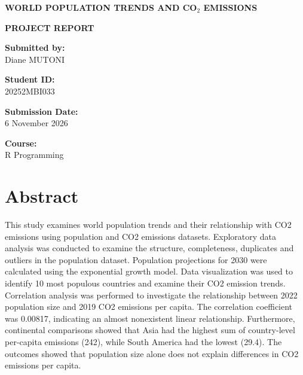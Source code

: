 \documentclass[10pt,a4paper]{article}
\begin{document}
\begin{titlepage}

\begin{center}

\vspace*{2cm}

{\Large\textbf{WORLD POPULATION TRENDS AND CO$_2$ EMISSIONS}}

\vspace{1.5cm}

{\large\textbf{PROJECT REPORT}}

\vspace{1.5cm}

\textbf{Submitted by:}\\
Diane MUTONI

\vspace{0.5cm}

\textbf{Student ID:}\\
20252MBI033

\vspace{0.5cm}

\textbf{Submission Date:}\\
6 November 2026

\vspace{0.5cm}

\textbf{Course:}\\
R Programming

\vfill

\end{center}

\end{titlepage}


\section{Abstract}

This study examines world population trends and their relationship with CO2 emissions using population and CO2 emissions datasets. Exploratory data analysis was conducted to examine the structure, completeness, duplicates and outliers in the population dataset. Population projections for 2030 were calculated using the exponential growth model. Data visualization was used to identify 10 most populous countries and examine their  CO2 emission trends. Correlation analysis was performed to investigate the relationship between 2022 population size and 2019 CO2 emissions per capita. The correlation coefficient was 0.00817, indicating an almost nonexistent linear relationship.
Furthermore, continental comparisons showed that Asia had the highest sum of country-level per-capita emissions (242), while South America had the lowest (29.4). The outcomes showed that population size alone does not explain differences in CO2 emissions per capita.
\end{document}
